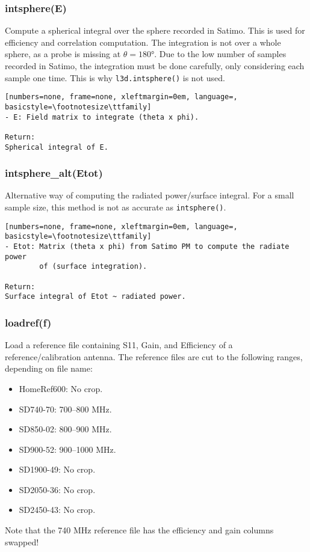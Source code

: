 \subsubsection{intsphere(E)}
Compute a spherical integral over the sphere recorded in Satimo. This is used
for efficiency and correlation computation. The integration is not over a
whole sphere, as a probe is missing at $\theta = \ang{180}$. Due to the low
number of samples recorded in Satimo, the integration must be done carefully,
only considering each sample one time. This is why \texttt{l3d.intsphere()}
is not used.

\begin{lstlisting}[numbers=none, frame=none, xleftmargin=0em, language=, basicstyle=\footnotesize\ttfamily]
- E: Field matrix to integrate (theta x phi).

Return:
Spherical integral of E.
\end{lstlisting}

\subsubsection{intsphere\_alt(Etot)}
Alternative way of computing the radiated power/surface integral. For a small
sample size, this method is not as accurate as \texttt{intsphere()}.

\begin{lstlisting}[numbers=none, frame=none, xleftmargin=0em, language=, basicstyle=\footnotesize\ttfamily]
- Etot: Matrix (theta x phi) from Satimo PM to compute the radiate power
        of (surface integration).

Return:
Surface integral of Etot ~ radiated power.
\end{lstlisting}

\subsubsection{loadref(f)}
Load a reference file containing S11, Gain, and Efficiency of a
reference/calibration antenna.
The reference files are cut to the following ranges, depending on file name:
\begin{itemize}
\item HomeRef600: No crop.
\item SD740-70: 700--800 MHz.
\item SD850-02: 800--900 MHz.
\item SD900-52: 900--1000 MHz.
\item SD1900-49: No crop.
\item SD2050-36: No crop.
\item SD2450-43: No crop.
\end{itemize}
Note that the 740 MHz reference file has the efficiency and gain columns
swapped!

